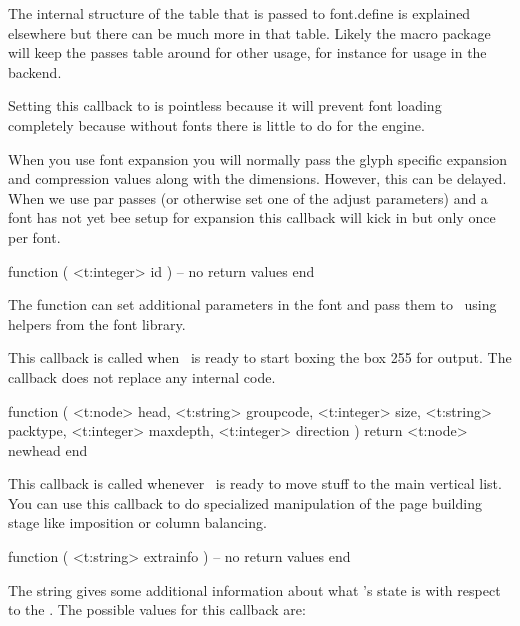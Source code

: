 The internal structure of the  table that is passed to \type
{font.define} is explained elsewhere but there can be much more in that table.
Likely the macro package will keep the passes table around for other usage, for
instance for usage in the backend.

Setting this callback to  is pointless because it will prevent font
loading completely because without fonts there is little to do for the engine.

\stopsubsection

\startsubsection[title=quality_font]

When you use font expansion you will normally pass the glyph specific expansion and
compression values along with the dimensions. However, this can be delayed. When we
use par passes (or otherwise set one of the adjust parameters) and a font has not
yet bee setup for expansion this callback will kick in but only once per font.

\starttyping[option=LUA]
function (
    <t:integer> id
)
    -- no return values
end
\stoptyping

The function can set additional parameters in the font and pass them to \TEX\ using
helpers from the font library.

\stopsubsection

\stopsection

\startsection[title=Typesetting]

\startsubsection[title=pre_output]

This callback is called when \TEX\ is ready to start boxing the box 255 for \prm
{output}. The callback does not replace any internal code.

\starttyping[option=LUA]
function (
    <t:node>    head,
    <t:string>  groupcode,
    <t:integer> size,
    <t:string>  packtype,
    <t:integer> maxdepth,
    <t:integer> direction
)
    return <t:node> newhead
end
\stoptyping

\stopsubsection

\startsubsection[title=buildpage]

This callback is called whenever \LUAMETATEX\ is ready to move stuff to the main
vertical list. You can use this callback to do specialized manipulation of the
page building stage like imposition or column balancing.

\starttyping[option=LUA]
function (
    <t:string> extrainfo
)
    -- no return values
end
\stoptyping

The string  gives some additional information about what \TEX's
state is with respect to the . The possible values for this
callback are:

